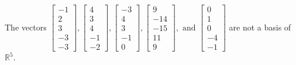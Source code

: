 \begin{exercise}
\begin{exerciseStatement}
  \end{exerciseStatement}
  \begin{exerciseAnswer}
   The vectors \(\left[\begin{array}{r}
-1 \\
2 \\
3 \\
-3 \\
-3
\end{array}\right] , \left[\begin{array}{r}
4 \\
3 \\
4 \\
-1 \\
-2
\end{array}\right] , \left[\begin{array}{r}
-3 \\
4 \\
3 \\
-1 \\
0
\end{array}\right] , \left[\begin{array}{r}
9 \\
-14 \\
-15 \\
11 \\
9
\end{array}\right] , \text{ and } \left[\begin{array}{r}
0 \\
1 \\
0 \\
-4 \\
-1
\end{array}\right]\) 
  	 are not  a basis of \(\mathbb{R}^5\).
  


  \end{exerciseAnswer}
\end{exercise}